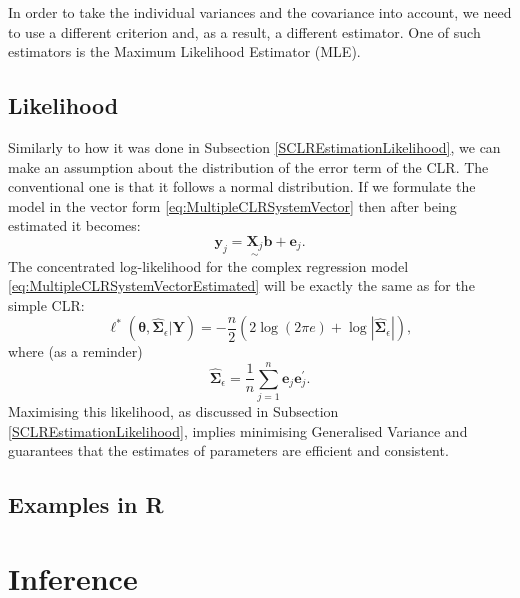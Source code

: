 \documentclass[
]{book}
\begin{document}
In order to take the individual variances and the covariance into account, we need to use a different criterion and, as a result, a different estimator. One of such estimators is the Maximum Likelihood Estimator (MLE).

\hypertarget{likelihood}{%
\subsection{Likelihood}\label{likelihood}}

Similarly to how it was done in Subsection \ref{SCLREstimationLikelihood}, we can make an assumption about the distribution of the error term of the CLR. The conventional one is that it follows a normal distribution. If we formulate the model in the vector form \eqref{eq:MultipleCLRSystemVector} then after being estimated it becomes:
\begin{equation}
    \mathbf{y}_j = \underset{\sim}{\mathbf{X}_j} \boldsymbol{b} + \boldsymbol{e}_j .
    \label{eq:MultipleCLRSystemVectorEstimated}
\end{equation}
The concentrated log-likelihood for the complex regression model \eqref{eq:MultipleCLRSystemVectorEstimated} will be exactly the same as for the simple CLR:
\begin{equation*}
    \ell^*(\boldsymbol{\theta}, \hat{\boldsymbol{\Sigma}}_\epsilon | \mathbf{Y}) = -\frac{n}{2} \left( 2 \log(2 \pi e) + \log | \hat{\boldsymbol{\Sigma}}_\epsilon | \right) ,
\end{equation*}
where (as a reminder)
\begin{equation*}
    \hat{\boldsymbol{\Sigma}}_\epsilon = \frac{1}{n} \sum_{j=1}^{n} \boldsymbol{e}_j \boldsymbol{e}_j^\prime .
\end{equation*}
Maximising this likelihood, as discussed in Subsection \ref{SCLREstimationLikelihood}, implies minimising Generalised Variance and guarantees that the estimates of parameters are efficient and consistent.

\hypertarget{examples-in-r}{%
\subsection{Examples in R}\label{examples-in-r}}

\hypertarget{inference}{%
\section{Inference}\label{inference}}
\end{document}
